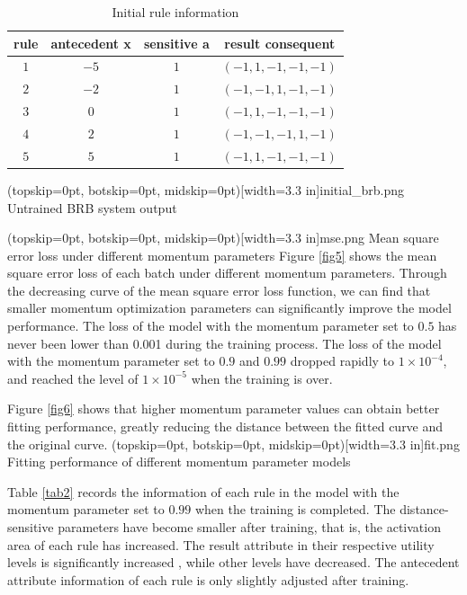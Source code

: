 \documentclass{ieeeaccess}
\begin{document}
\begin{table}
    \caption{Initial rule information}
    \centering
    \label{tab1}
    \begin{tabular}{cccc}
        \hline
        rule & antecedent x & sensitive a & result consequent     \\
        \hline
        $1$  & $-5$         & $1$         & $(-1, 1, -1, -1, -1)$ \\
        $2$  & $-2$         & $1$         & $(-1, -1, 1, -1, -1)$ \\
        $3$  & $0$          & $1$         & $(-1, 1, -1, -1, -1)$ \\
        $4$  & $2$          & $1$         & $(-1, -1, -1, 1, -1)$ \\
        $5$  & $5$          & $1$         & $(-1, 1, -1, -1, -1)$ \\
        \hline
    \end{tabular}
\end{table}

\Figure[!t](topskip=0pt, botskip=0pt, midskip=0pt)[width=3.3 in]{initial_brb.png}
{Untrained BRB system output\label{fig4}}

\Figure[!t](topskip=0pt, botskip=0pt, midskip=0pt)[width=3.3 in]{mse.png}
{Mean square error loss under different momentum parameters\label{fig5}}
Figure \ref{fig5} shows the mean square error loss of each batch under different momentum parameters.
Through the decreasing curve of the mean square error loss function,
we can find that smaller momentum optimization parameters can significantly improve the model performance.
The loss of the model with the momentum parameter set to $0.5$ has never been lower than 0.001 during the training process.
The loss of the model with the momentum parameter set to $0.9$ and $0.99$ dropped rapidly to $1\times10^{-4}$,
and reached the level of $1\times10^{-5}$ when the training is over.

Figure \ref{fig6} shows that higher momentum parameter values can obtain better fitting performance,
greatly reducing the distance between the fitted curve and the original curve.
\Figure[!t](topskip=0pt, botskip=0pt, midskip=0pt)[width=3.3 in]{fit.png}
{Fitting performance of different momentum parameter models\label{fig6}}

Table \ref{tab2} records the information of each rule in the model with the momentum parameter set to $0.99$ when the training is completed.
The distance-sensitive parameters have become smaller after training, that is, the activation area of each rule has increased.
The result attribute in their respective utility levels is significantly increased , while other levels have decreased.
The antecedent attribute information of each rule is only slightly adjusted after training.
\end{document}
